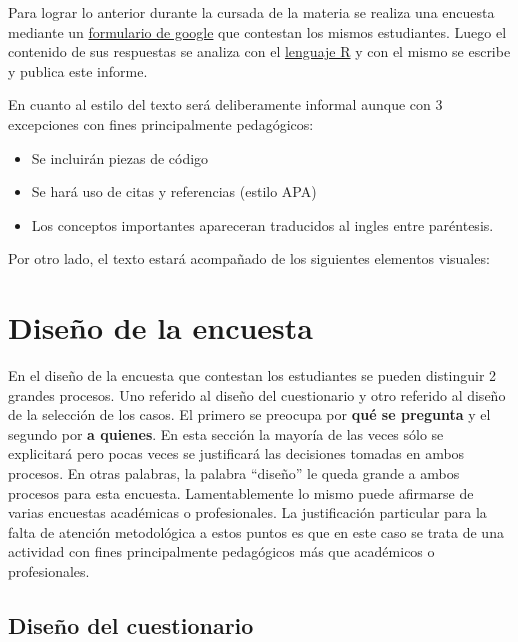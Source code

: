 \documentclass[
  letterpaper,
  DIV=11,
  numbers=noendperiod]{scrreprt}
\begin{document}
Para lograr lo anterior durante la cursada de la materia se realiza una
encuesta mediante un
\href{https://www.google.com/intl/es-419_ar/forms/about/}{formulario de
google} que contestan los mismos estudiantes. Luego el contenido de sus
respuestas se analiza con el \href{https://www.r-project.org/}{lenguaje
R} y con el mismo se escribe y publica este informe.

En cuanto al estilo del texto será deliberamente informal aunque con 3
excepciones con fines principalmente pedagógicos:

\begin{itemize}
\item
  Se incluirán piezas de código
\item
  Se hará uso de citas y referencias (estilo APA)
\item
  Los conceptos importantes apareceran traducidos al ingles entre
  paréntesis.
\end{itemize}

Por otro lado, el texto estará acompañado de los siguientes elementos
visuales:


\hypertarget{diseuxf1o-de-la-encuesta}{%
\chapter{Diseño de la encuesta}\label{diseuxf1o-de-la-encuesta}}

En el diseño de la encuesta que contestan los estudiantes se pueden
distinguir 2 grandes procesos. Uno referido al diseño del cuestionario y
otro referido al diseño de la selección de los casos. El primero se
preocupa por \textbf{qué se pregunta} y el segundo por \textbf{a
quienes}. En esta sección la mayoría de las veces sólo se explicitará
pero pocas veces se justificará las decisiones tomadas en ambos
procesos. En otras palabras, la palabra ``diseño'' le queda grande a
ambos procesos para esta encuesta. Lamentablemente lo mismo puede
afirmarse de varias encuestas académicas o profesionales. La
justificación particular para la falta de atención metodológica a estos
puntos es que en este caso se trata de una actividad con fines
principalmente pedagógicos más que académicos o profesionales.

\hypertarget{diseuxf1o-del-cuestionario}{%
\section{Diseño del cuestionario}\label{diseuxf1o-del-cuestionario}}
\end{document}
